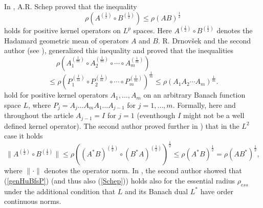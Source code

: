 \documentclass[12pt, reqno]{amsart}
\theoremstyle{definition}
\theoremstyle{remark}
\numberwithin{equation}{section}
\newcommand{\be}{\begin{equation}}
\newcommand{\ee}{\end{equation}}
\begin{document}
In \cite[Theorem 2.8]{S11},  A.R. Schep proved
 that the inequality
\be
\rho \left(A ^{\left( \frac{1}{2} \right)} \circ B  ^{\left( \frac{1}{2} \right)} \right) \le \rho (AB) ^{\frac{1}{2}}
\label{Schep}
\ee
holds for positive kernel operators on $L^p$ spaces. Here $A ^{\left( \frac{1}{2} \right)} \circ B  ^{\left( \frac{1}{2}\right)} $ denotes the Hadamard geometric mean of operators $A$ and $B$. 
 R. Drnov\v{s}ek and the second author (see \cite{DP16, P17+}), generalized this inequality and proved that the inequalities
$$\rho \left(A_1^{\left(\frac{1}{m}\right)} \circ A_2^{\left(\frac{1}{m}\right)} \circ \cdots \circ
A_m^{\left(\frac{1}{m}\right)}\right) \;\;\;\;\;\;\;\;\;\;\;\;\;\;\;\;\;\;\;\;\;\;\;\;\;\;\;\;\;\;$$
\be
\le \rho  \left(P_1^{\left(\frac{1}{m}\right)} \circ P_2^{\left(\frac{1}{m}\right)} \circ \cdots \circ
P_m^{\left(\frac{1}{m}\right)}\right) ^{\frac{1}{m}}  \le \rho (A_1 A_2 \cdots A_m) ^{\frac{1}{m}} .
\label{genHuBfsP}
\ee
hold  for positive kernel operators $A_1, \ldots, A_m$ on an arbitrary Banach function space $L$, where  $P_j = A_j \ldots A_m A_1 \ldots A_{j-1}$ for $j=1,\ldots , m$.  Formally, here and throughout the article $A_{j-1}=I$ for $j=1$ (eventhough $I$ might not be a well defined kernel operator). The second author proved further in \cite[Theorem 4.4, (4.8)]{P17+}) that in the $L^2$ case  it holds
\be
\|A^{(\frac{1}{2})} \circ  B^{(\frac{1}{2})} \| \le \rho  \left ( (A^* B ) ^{(\frac{1}{2})}\circ (B ^* A)^{(\frac{1}{2})}\right)^{\frac{1}{2}} \le \rho  (A^* B )^{\frac{1}{2}}= \rho  (A B^*)^{\frac{1}{2}},
\label{Pep19}
\ee
where $\|\cdot\|$ denotes the operator norm. 
In \cite[Theorem 3.2]{P19}, the second author showed that (\ref{genHuBfsP}) (and thus also (\ref{Schep})) holds also for the essential radius $\rho _{ess}$ under the additional condition that $L$ and its Banach dual $L^*$ have order continuous norms.
\end{document}

